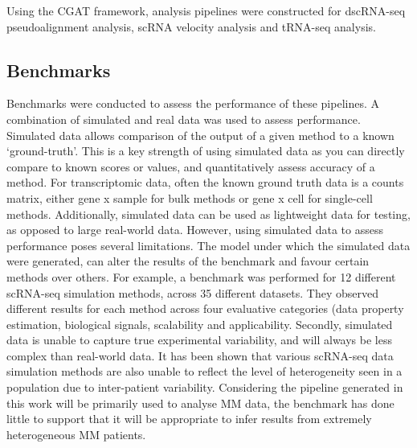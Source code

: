 Using the CGAT framework, analysis pipelines were constructed for dscRNA-seq pseudoalignment analysis, scRNA velocity analysis and tRNA-seq analysis.

\subsection{Benchmarks}
Benchmarks were conducted to assess the performance of these pipelines.
A combination of simulated and real data was used to assess performance.
Simulated data allows comparison of the output of a given method to a known `ground-truth'.
This is a key strength of using simulated data as you can directly compare to known scores or values, and quantitatively assess accuracy of a method.
For transcriptomic data, often the known ground truth data is a counts matrix, either gene x sample for bulk methods or gene x cell for single-cell methods.
Additionally, simulated data can be used as lightweight data for testing, as opposed to large real-world data.
However, using simulated data to assess performance poses several limitations.
The model under which the simulated data were generated, can alter the results of the benchmark and favour certain methods over others.
For example, a benchmark was performed for 12 different scRNA-seq simulation methods, across 35 different datasets.
They observed different results for each method across four evaluative categories (data property estimation, biological signals, scalability and applicability\cite{cao2021benchmark}.
Secondly, simulated data is unable to capture true experimental variability, and will always be less complex than real-world data\cite{mangul2019systematic}.
It has been shown that various scRNA-seq data simulation methods are also unable to reflect the level of heterogeneity seen in a population due to inter-patient variability\cite{cao2021benchmark}.
Considering the pipeline generated in this work will be primarily used to analyse MM data, the benchmark has done little to support that it will be appropriate to infer results from extremely heterogeneous MM patients.



